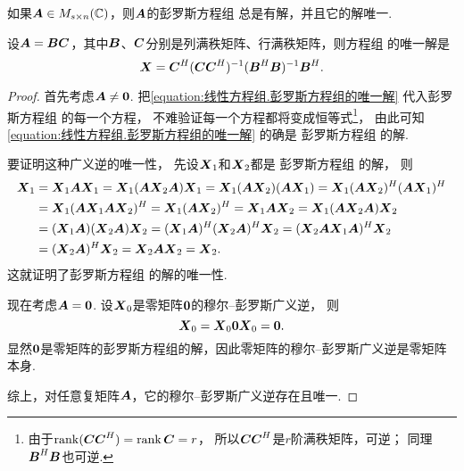 \begin{theorem}[穆尔--彭罗斯广义逆的唯一性]\label{theorem:线性方程组.穆尔--彭罗斯广义逆的唯一性}
如果\(\boldsymbol{A} \in M_{s \times n}(\mathbb{C})\)，则\(\boldsymbol{A}\)的彭罗斯方程组  总是有解，并且它的解唯一.

设\(\boldsymbol{A}=\boldsymbol{B}\boldsymbol{C}\)，其中\(\boldsymbol{B}\)、\(\boldsymbol{C}\)分别是列满秩矩阵、行满秩矩阵，则方程组  的唯一解是
\begin{equation}\label{equation:线性方程组.彭罗斯方程组的唯一解}
	\boldsymbol{X} = \boldsymbol{C}^H (\boldsymbol{C} \boldsymbol{C}^H)^{-1} (\boldsymbol{B}^H \boldsymbol{B})^{-1} \boldsymbol{B}^H.
\end{equation}
\begin{proof}
首先考虑\(\boldsymbol{A}\neq\boldsymbol0\).
把\cref{equation:线性方程组.彭罗斯方程组的唯一解}
代入彭罗斯方程组  的每一个方程，
不难验证每一个方程都将变成恒等式\footnote{由于\(\rank(\boldsymbol{C}\boldsymbol{C}^H)=\rank\boldsymbol{C}=r\)，
所以\(\boldsymbol{C}\boldsymbol{C}^H\)是\(r\)阶满秩矩阵，可逆；
同理\(\boldsymbol{B}^H\boldsymbol{B}\)也可逆.}，
由此可知\cref{equation:线性方程组.彭罗斯方程组的唯一解} 的确是
彭罗斯方程组  的解.

要证明这种广义逆的唯一性，
先设\(\boldsymbol{X}_1\)和\(\boldsymbol{X}_2\)都是
彭罗斯方程组  的解，
则\begin{align*}
	\boldsymbol{X}_1
	&= \boldsymbol{X}_1\boldsymbol{A}\boldsymbol{X}_1
	= \boldsymbol{X}_1(\boldsymbol{A}\boldsymbol{X}_2\boldsymbol{A})\boldsymbol{X}_1
	= \boldsymbol{X}_1(\boldsymbol{A}\boldsymbol{X}_2)(\boldsymbol{A}\boldsymbol{X}_1)
	= \boldsymbol{X}_1(\boldsymbol{A}\boldsymbol{X}_2)^H(\boldsymbol{A}\boldsymbol{X}_1)^H \\
	&= \boldsymbol{X}_1(\boldsymbol{A}\boldsymbol{X}_1\boldsymbol{A}\boldsymbol{X}_2)^H
	= \boldsymbol{X}_1(\boldsymbol{A}\boldsymbol{X}_2)^H
	= \boldsymbol{X}_1\boldsymbol{A}\boldsymbol{X}_2
	= \boldsymbol{X}_1(\boldsymbol{A}\boldsymbol{X}_2\boldsymbol{A})\boldsymbol{X}_2 \\
	&= (\boldsymbol{X}_1\boldsymbol{A})(\boldsymbol{X}_2\boldsymbol{A})\boldsymbol{X}_2
	= (\boldsymbol{X}_1\boldsymbol{A})^H(\boldsymbol{X}_2\boldsymbol{A})^H\boldsymbol{X}_2
	= (\boldsymbol{X}_2\boldsymbol{A}\boldsymbol{X}_1\boldsymbol{A})^H \boldsymbol{X}_2 \\
	&= (\boldsymbol{X}_2\boldsymbol{A})^H \boldsymbol{X}_2
	= \boldsymbol{X}_2\boldsymbol{A}\boldsymbol{X}_2
	= \boldsymbol{X}_2.
\end{align*}
这就证明了彭罗斯方程组  的解的唯一性.

现在考虑\(\boldsymbol{A}=\boldsymbol0\).
设\(\boldsymbol{X}_0\)是零矩阵\(\boldsymbol0\)的穆尔--彭罗斯广义逆，
则\begin{equation*}
	\boldsymbol{X}_0 = \boldsymbol{X}_0 \boldsymbol0 \boldsymbol{X}_0 = \boldsymbol0.
\end{equation*}
显然\(\boldsymbol0\)是零矩阵的彭罗斯方程组的解，因此零矩阵的穆尔--彭罗斯广义逆是零矩阵本身.

综上，对任意复矩阵\(\boldsymbol{A}\)，它的穆尔--彭罗斯广义逆存在且唯一.
\end{proof}
\end{theorem}
